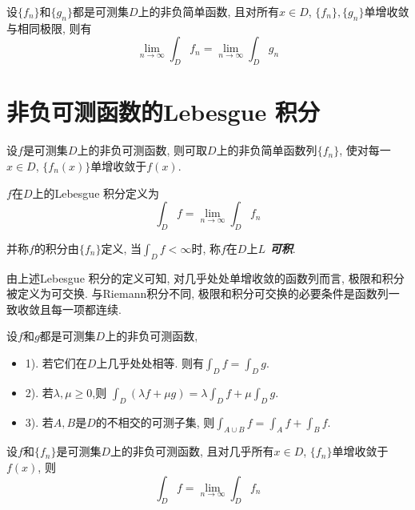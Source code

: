\documentclass[12pt, a4paper, oneside, UTF8]{ctexbook}  %
\begin{document}
\begin{thm}
    设$\{f_n\}$和$\{g_n\}$都是可测集$D$上的非负简单函数, 且对所有$x \in D$, $\{f_n\}, \{g_n\}$单增收敛与相同极限, 则有
    $$ \lim_{n\to\infty}\int_{D}f_n = \lim_{n\to\infty}\int_{D}g_n $$
\end{thm}


\section{非负可测函数的Lebesgue 积分}
    \par 设$f$是可测集$D$上的非负可测函数, 则可取$D$上的非负简单函数列$\{f_n\}$, 使对每一$x\in D$, 
    $\{f_n(x)\}$单增收敛于$f(x)$.

    \begin{defn}
        $f$在$D$上的Lebesgue 积分定义为
        \begin{equation}
            \int_{D}f=\lim_{n\to\infty}\int_{D}f_n
        \end{equation}
    \end{defn}
    并称$f$的积分由$\{f_n\}$定义, 当$\int_{D}f<\infty$时, 称$f$在$D$上\textbf{\emph{$L$ 可积}}.

    \begin{rmk}
        由上述Lebesgue 积分的定义可知, 对几乎处处单增收敛的函数列而言, 极限和积分被定义为可交换.
        与Riemann积分不同, 极限和积分可交换的必要条件是函数列一致收敛且每一项都连续.
    \end{rmk}



\begin{thm}
    设$f$和$g$都是可测集$D$上的非负可测函数, 
    \begin{itemize}
        \item 1). 若它们在$D$上几乎处处相等. 则有$ \int_{D}f = \int_{D}g $.
        \item 2). 若$\lambda, \mu \geq 0$,则 $\int _{D}(\lambda f + \mu g)=\lambda\int _{D}f+\mu\int _{D}g$.
        \item 3). 若$A, B$是$D$的不相交的可测子集, 则$\int _{A\cup B}f=\int_{A}f+\int_{B}f$.
    \end{itemize}
\end{thm}

\begin{thm}\label{Levi}
    设$f$和$\{f_n\}$是可测集$D$上的非负可测函数, 且对几乎所有$x \in D$, $\{f_n\}$单增收敛于$f(x)$, 则
    $$ \int_{D}f=\lim_{n\to\infty}\int_{D}f_n $$
\end{thm}
\end{document}
